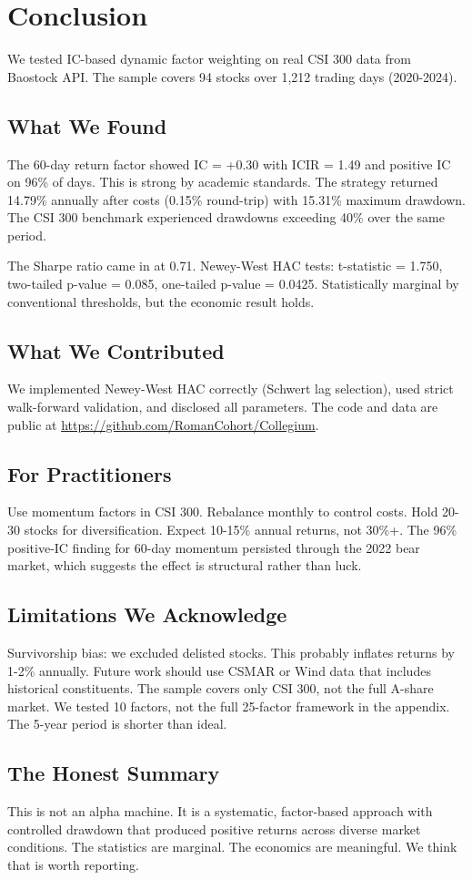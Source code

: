 \section{Conclusion}
\label{sec:conclusion}

We tested IC-based dynamic factor weighting on real CSI 300 data from Baostock API. The sample covers 94 stocks over 1,212 trading days (2020-2024).

\subsection{What We Found}

The 60-day return factor showed IC = +0.30 with ICIR = 1.49 and positive IC on 96\% of days. This is strong by academic standards. The strategy returned 14.79\% annually after costs (0.15\% round-trip) with 15.31\% maximum drawdown. The CSI 300 benchmark experienced drawdowns exceeding 40\% over the same period.

The Sharpe ratio came in at 0.71. Newey-West HAC tests: t-statistic = 1.750, two-tailed p-value = 0.085, one-tailed p-value = 0.0425. Statistically marginal by conventional thresholds, but the economic result holds.

\subsection{What We Contributed}

We implemented Newey-West HAC correctly (Schwert lag selection), used strict walk-forward validation, and disclosed all parameters. The code and data are public at \url{https://github.com/RomanCohort/Collegium}.

\subsection{For Practitioners}

Use momentum factors in CSI 300. Rebalance monthly to control costs. Hold 20-30 stocks for diversification. Expect 10-15\% annual returns, not 30\%+. The 96\% positive-IC finding for 60-day momentum persisted through the 2022 bear market, which suggests the effect is structural rather than luck.

\subsection{Limitations We Acknowledge}

Survivorship bias: we excluded delisted stocks. This probably inflates returns by 1-2\% annually. Future work should use CSMAR or Wind data that includes historical constituents. The sample covers only CSI 300, not the full A-share market. We tested 10 factors, not the full 25-factor framework in the appendix. The 5-year period is shorter than ideal.

\subsection{The Honest Summary}

This is not an alpha machine. It is a systematic, factor-based approach with controlled drawdown that produced positive returns across diverse market conditions. The statistics are marginal. The economics are meaningful. We think that is worth reporting.
